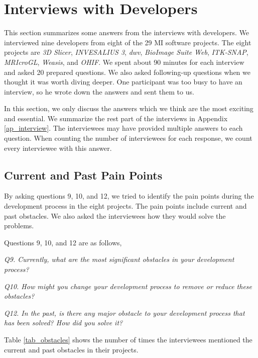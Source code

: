 \chapter{Interviews with Developers}
\label{ch_interview}

This section summarizes some answers from the interviews with developers. We interviewed nine developers from eight of the 29 MI software projects. The eight projects are \textit{3D Slicer}, \textit{INVESALIUS 3}, \textit{dwv}, \textit{BioImage Suite Web}, \textit{ITK-SNAP}, \textit{MRIcroGL}, \textit{Weasis}, and \textit{OHIF}. We spent about 90 minutes for each interview and asked 20 prepared questions. We also asked following-up questions when we thought it was worth diving deeper. One participant was too busy to have an interview, so he wrote down the answers and sent them to us.

In this section, we only discuss the answers which we think are the most exciting and essential. We summarize the rest part of the interviews in Appendix \ref{ap_interview}. The interviewees may have provided multiple answers to each question. When counting the number of interviewees for each response, we count every interviewee with this answer.

\section{Current and Past Pain Points}
\label{sec_interview_pain_points}

By asking questions 9, 10, and 12, we tried to identify the pain points during the development process in the eight projects. The pain points include current and past obstacles. We also asked the interviewees how they would solve the problems.

Questions 9, 10, and 12 are as follows,

\textit{Q9. Currently, what are the most significant obstacles in your development process?}

\textit{Q10. How might you change your development process to remove or reduce these obstacles?}

\textit{Q12. In the past, is there any major obstacle to your development process that has been solved? How did you solve it?}

Table \ref{tab_obstacles} shows the number of times the interviewees mentioned the current and past obstacles in their projects.

